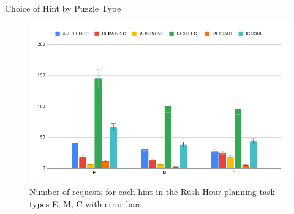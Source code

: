 \begin{frame}{Choice of Hint by Puzzle Type}
\begin{figure}[tpb]
  \centering
\includegraphics[width=0.8\columnwidth]{../img/typeandreq.png}
  \caption{Number of requests for each hint in the Rush Hour planning task types E, M, C with error bars.}
  \label{fig:groupandrequest}
\end{figure}

\end{frame}